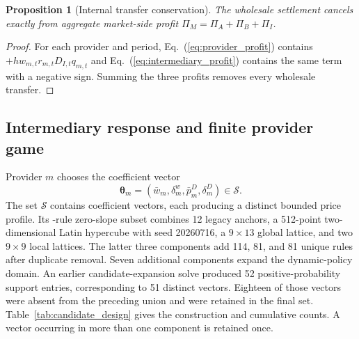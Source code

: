 \documentclass[11pt,a4paper]{article}
\newtheorem{proposition}{Proposition}
\newcommand{\Sset}{\mathcal{S}}
\begin{document}
\begin{proposition}[Internal transfer conservation]
The wholesale settlement cancels exactly from aggregate market-side profit $\Pi_M=\Pi_A+\Pi_B+\Pi_I$.
\end{proposition}
\begin{proof}
For each provider and period, Eq.~(\ref{eq:provider_profit}) contains $+hw_{m,t}r_{m,t}D_{I,t}q_{m,t}$ and Eq.~(\ref{eq:intermediary_profit}) contains the same term with a negative sign. Summing the three profits removes every wholesale transfer.
\end{proof}

\subsection{Intermediary response and finite provider game}

Provider $m$ chooses the coefficient vector
\begin{equation}
\boldsymbol\theta_m=(\bar w_m,\delta^w_m,\bar p^D_m,\delta^D_m)\in\Sset.
\label{eq:provider_vector}
\end{equation}
The set $\Sset$ contains \ProviderCandidateCount{} coefficient vectors, each producing a distinct bounded price profile. Its \UniformCandidateCount{}-rule zero-slope subset combines 12 legacy anchors, a 512-point two-dimensional Latin hypercube with seed 20260716, a $9\times13$ global lattice, and two $9\times9$ local lattices. The latter three components add 114, 81, and 81 unique rules after duplicate removal. Seven additional components expand the dynamic-policy domain. An earlier candidate-expansion solve produced 52 positive-probability support entries, corresponding to 51 distinct vectors. Eighteen of those vectors were absent from the preceding union and were retained in the final set. Table~\ref{tab:candidate_design} gives the construction and cumulative counts. A vector occurring in more than one component is retained once.
\end{document}
